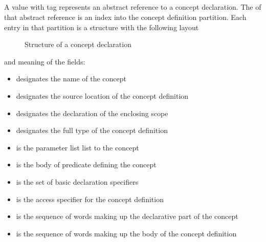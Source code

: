 
\subsection{}
\label{sec:ifc:DeclSort:Concept}

A  value with tag  represents an abstract reference
to a concept declaration.  The  of that abstract reference is an index into the concept
definition partition.  Each entry in that partition is a structure with the following layout
%
\begin{figure}[H]
	\centering
	\caption{Structure of a concept declaration}
	\label{fig:ifc-concept-decl-structure}
\end{figure}
%
and meaning of the fields:
\begin{itemize}
	\item {} designates the name of the concept
	\item {} designates the source location of the concept definition
	\item {} designates the declaration of the enclosing scope
	\item {} designates the full type of the concept definition
	\item {} is the parameter list list to the concept
	\item {} is the body of predicate defining the concept
	\item {} is the set of basic declaration specifiers
	\item {} is the access specifier for the concept definition
	\item {} is the sequence of words making up the declarative part of the concept
	\item {} is the sequence of words making up the body of the concept definition
\end{itemize}


